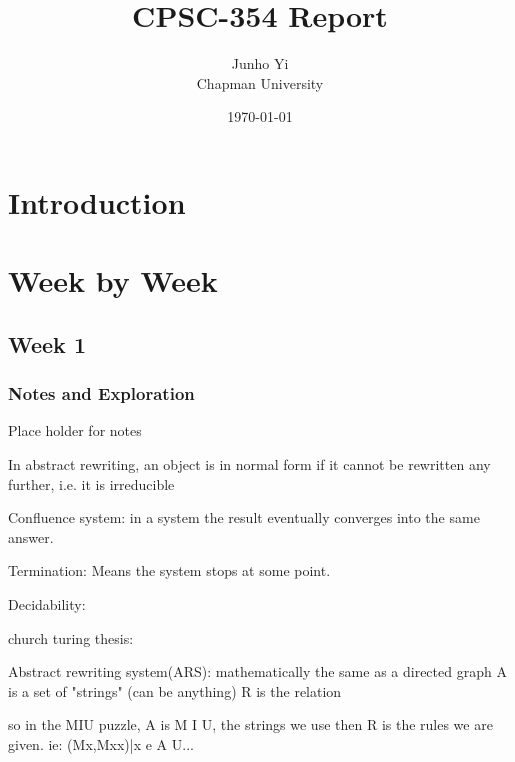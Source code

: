 \documentclass{article}
\title{CPSC-354 Report}
\author{Junho Yi  \\ Chapman University}
\date{\today}
\theoremstyle{theorem}
\theoremstyle{definition}
\theoremstyle{remark}
\begin{document}
\maketitle

\begin{abstract}
\end{abstract}

\setcounter{tocdepth}{3}
\tableofcontents

\section{Introduction}\label{intro}

\section{Week by Week}\label{homework}

\subsection{Week 1}

\subsubsection{Notes and Exploration}

Place holder for notes


In abstract rewriting, an object is in normal form if it cannot be rewritten any further, i.e. it is irreducible

Confluence system: in a system the result eventually converges into the same answer.

Termination: Means the system stops at some point. 

Decidability: 

church turing thesis:

Abstract rewriting system(ARS): mathematically the same as a directed graph
A is a set of "strings" (can be anything)
R is the relation

so in the MIU puzzle, A is M I U, the strings we use
then R is the rules we are given. ie: {(Mx,Mxx)|x e A} U...
\end{document}
